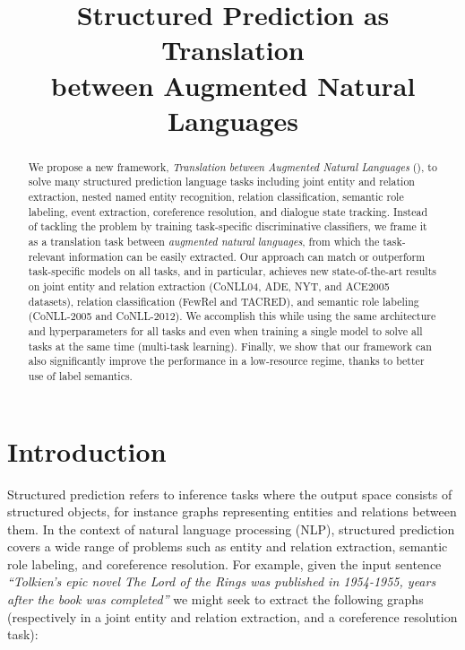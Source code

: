 \title{Structured Prediction as Translation \\ between Augmented Natural Languages}



\maketitle

\begin{abstract}
We propose a new framework, \emph{Translation between Augmented Natural Languages} (\ourmodel), to solve many structured prediction language tasks including joint entity and relation extraction, nested named entity recognition, relation classification, semantic role labeling, event extraction, coreference resolution, and dialogue state tracking. Instead of tackling the problem by training task-specific discriminative classifiers, we frame it as a translation task between \emph{augmented natural languages}, from which the task-relevant information can be easily extracted. Our approach can match or outperform task-specific models on all tasks, and in particular, achieves new state-of-the-art results on joint entity and relation extraction (CoNLL04, ADE, NYT, and ACE2005 datasets), relation classification (FewRel and TACRED), and semantic role labeling (CoNLL-2005 and CoNLL-2012). We accomplish this while using the same architecture and hyperparameters for all tasks and even when training a single model to solve all tasks at the same time (multi-task learning). Finally, we show that our framework can also significantly improve the performance in a low-resource regime, thanks to better use of label semantics.

\end{abstract}

\section{Introduction} \label{sec:introduction}

Structured prediction refers to inference tasks where the output space consists of structured objects, for instance graphs representing entities and relations between them.
In the context of natural language processing (NLP), structured prediction covers a wide range of problems such as entity and relation extraction, semantic role labeling, and coreference resolution.
For example, given the input sentence \textit{``Tolkien's epic novel The Lord of the Rings was published in 1954-1955, years after the book was completed''} we might seek to extract the following graphs (respectively in a joint entity and relation extraction, and a coreference resolution task):

